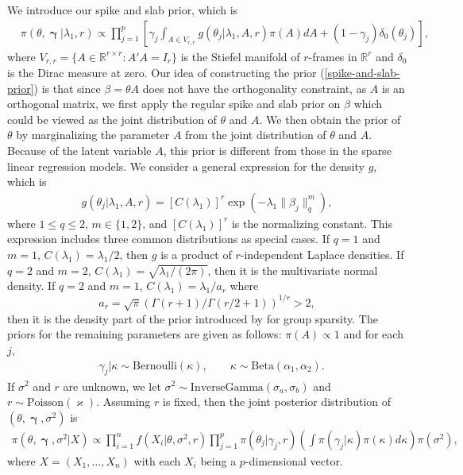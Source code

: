 \documentclass[pdftex, noinfoline, letter]{imsart}
\DeclareMathOperator*{\bgamma}{\boldsymbol{\gamma}}
\theoremstyle{plain}
\begin{document}
We introduce our spike and slab prior, which is 
\begin{align}
\label{spike-and-slab-prior}
& \pi(\theta, \bgamma|\lambda_1, r) \propto 
\prod_{j=1}^p 
\left[
	\gamma_j \int_{A \in V_{r,r}} g(\theta_j|\lambda_1, A, r) \pi(A) d A+ (1-\gamma_j) \delta_0(\theta_j)
\right],
\end{align}
where 
$V_{r,r} = \{
A \in \mathbb{R}^{r \times r}: A'A = I_r
\}$ is the Stiefel manifold of $r$-frames in $\mathbb{R}^r$ and $\delta_0$ is the Dirac measure at zero.
Our idea of constructing the prior (\ref{spike-and-slab-prior}) is that since $\beta = \theta A$ does not have the orthogonality constraint, as $A$ is an orthogonal matrix, we first apply the regular spike and slab prior on $\beta$ which could be viewed as the joint distribution of $\theta$ and $A$. We then obtain the prior of $\theta$ by marginalizing the parameter $A$ from the joint distribution of $\theta$ and $A$.
Because of the latent variable $A$, this prior is different from those in the sparse linear regression models.
We consider a general expression for the density $g$, which is
\begin{align}
\label{prior-beta}
g(\theta_j|\lambda_1, A, r) = [C(\lambda_1)]^r \exp(-\lambda_1 \|\beta_j\|_q^m),
\end{align}
where $1 \leq q \leq 2$, $m \in \{1, 2\}$, and $[C(\lambda_1)]^r$ is the normalizing constant.
This expression includes three common distributions as special cases. If $q = 1$ and $m = 1$, $C(\lambda_1) = \lambda_1/2$, then $g$ is a product of $r$-independent Laplace densities. If $q = 2$ and $m = 2$, $C(\lambda_1) = \sqrt{\lambda_1/(2\pi)}$, then it is the multivariate normal density. If $q = 2$ and $m = 1$, $C(\lambda_1) = \lambda_1/a_r$ where $$a_r = \sqrt{\pi}\left(\Gamma(r+1)/\Gamma(r/2+1)\right)^{1/r} > 2,$$ then it is the density part of the prior introduced by \citet{ning20} for group sparsity.
The priors for the remaining parameters are given as follows: $\pi(A) \propto 1$ and for each $j$, 
\begin{align}
\label{prior-gamma}
& \gamma_j| \kappa \sim \text{Bernoulli}(\kappa), \qquad \kappa \sim \text{Beta}(\alpha_1, \alpha_2).
\end{align}
If $\sigma^2$ and $r$ are unknown, we let $\sigma^2 \sim \text{InverseGamma}(\sigma_a, \sigma_b)$ and $r \sim \text{Poisson}(\varkappa)$.
Assuming $r$ is fixed, then the joint posterior distribution of $(\theta, \bgamma, \sigma^2)$ is
\begin{align}
\label{posterior}
\pi(\theta, \bgamma, \sigma^2|X) 
\propto 
\prod_{i=1}^n f(X_i|\theta, \sigma^2, r) \prod_{j=1}^p \pi(\theta_j |\gamma_j, r) \left(\int \pi(\gamma_j|\kappa)\pi(\kappa)d\kappa\right) \pi(\sigma^2),
\end{align}
where $X=(X_1,\ldots,X_n)$ with each $X_i$ being a $p$-dimensional vector.
\end{document}
